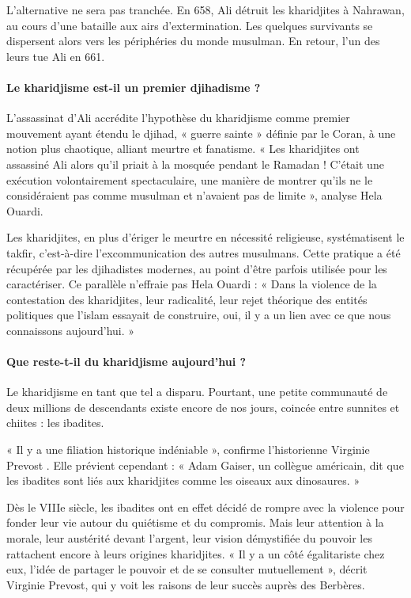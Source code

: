 L’alternative ne sera pas tranchée. En 658, Ali détruit les kharidjites à Nahrawan, au cours d’une bataille aux airs d’extermination. Les quelques survivants se dispersent alors vers les périphéries du monde musulman. En retour, l’un des leurs tue Ali en 661.
\paragraph{
Le kharidjisme est-il un premier djihadisme ?}

L’assassinat d’Ali accrédite l’hypothèse du kharidjisme comme premier mouvement ayant étendu le djihad, « guerre sainte » définie par le Coran, à une notion plus chaotique, alliant meurtre et fanatisme. « Les kharidjites ont assassiné Ali alors qu’il priait à la mosquée pendant le Ramadan ! C’était une exécution volontairement spectaculaire, une manière de montrer qu’ils ne le considéraient pas comme musulman et n’avaient pas de limite », analyse Hela Ouardi.

Les kharidjites, en plus d’ériger le meurtre en nécessité religieuse, systématisent le takfir, c’est-à-dire l’excommunication des autres musulmans. Cette pratique a été récupérée par les djihadistes modernes, au point d’être parfois utilisée pour les caractériser. Ce parallèle n’effraie pas Hela Ouardi : « Dans la violence de la contestation des kharidjites, leur radicalité, leur rejet théorique des entités politiques que l’islam essayait de construire, oui, il y a un lien avec ce que nous connaissons aujourd’hui. »
\paragraph{
Que reste-t-il du kharidjisme aujourd’hui ?}


\begin{Def}[ibadites]
Le kharidjisme en tant que tel a disparu. Pourtant, une petite communauté de deux millions de descendants existe encore de nos jours, coincée entre sunnites et chiites : les ibadites.
\end{Def}
 « Il y a une filiation historique indéniable », confirme l’historienne Virginie Prevost . Elle prévient cependant : « Adam Gaiser, un collègue américain, dit que les ibadites sont liés aux kharidjites comme les oiseaux aux dinosaures. »

Dès le VIIIe siècle, les ibadites ont en effet décidé de rompre avec la violence pour fonder leur vie autour du quiétisme et du compromis. Mais leur attention à la morale, leur austérité devant l’argent, leur vision démystifiée du pouvoir les rattachent encore à leurs origines kharidjites. « Il y a un côté égalitariste chez eux, l’idée de partager le pouvoir et de se consulter mutuellement », décrit Virginie Prevost, qui y voit les raisons de leur succès auprès des Berbères.

